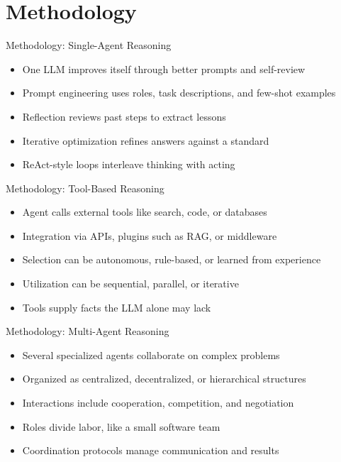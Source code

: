 \documentclass[10pt]{beamer}
\begin{document}
\section{Methodology}
\begin{frame}[allowframebreaks]{Methodology: Single-Agent Reasoning}
\begin{itemize}
  \item One LLM improves itself through better prompts and self-review
  \item Prompt engineering uses roles, task descriptions, and few-shot examples
  \item Reflection reviews past steps to extract lessons
  \item Iterative optimization refines answers against a standard
  \item ReAct-style loops interleave thinking with acting
\end{itemize}
\end{frame}
\begin{frame}[allowframebreaks]{Methodology: Tool-Based Reasoning}
\begin{itemize}
  \item Agent calls external tools like search, code, or databases
  \item Integration via APIs, plugins such as RAG, or middleware
  \item Selection can be autonomous, rule-based, or learned from experience
  \item Utilization can be sequential, parallel, or iterative
  \item Tools supply facts the LLM alone may lack
\end{itemize}
\end{frame}
\begin{frame}[allowframebreaks]{Methodology: Multi-Agent Reasoning}
\begin{itemize}
  \item Several specialized agents collaborate on complex problems
  \item Organized as centralized, decentralized, or hierarchical structures
  \item Interactions include cooperation, competition, and negotiation
  \item Roles divide labor, like a small software team
  \item Coordination protocols manage communication and results
\end{itemize}
\end{frame}
\end{document}

